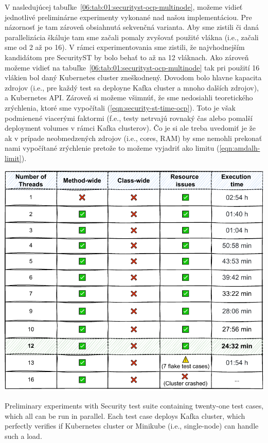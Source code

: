 V nasledujúcej tabuľke~\ref{06:tab:01:securityst-ocp-multinode}, možeme vidieť jednotlivé preliminárne experimenty vykonané
nad našou implementáciou. Pre názornosť je tam zároveň obsiahnutá sekvenčná varianta. Aby sme zistili či daná parallelizácia
škáluje tam sme začali pomaly zvyšovať použité vlákna (i.e., začali sme od 2 až po 16). V rámci experimentovania sme zistili,
že najvhodnejším kandidátom pre SecurityST by bolo behať to až na 12 vláknach. Ako zároveň možeme vidieť na
tabuľke~\ref{06:tab:01:securityst-ocp-multinode} tak pri použití 16 vlákien bol daný Kubernetes cluster zneškodnený.
Dovodom bolo hlavne kapacita zdrojov (i.e., pre každý test sa deployne Kafka cluster a mnoho dalších zdrojov), a Kubernetes API.
Zároveň si možeme všimnúť, že sme nedosiahli teoretického zrýchlenia, ktoré sme vypočítali (\eqref{eqn:security-st-time-ocp}).
Toto je však podmienené viacerými faktormi (f.e., testy netrvajú rovnaký čas alebo pomalší deployment volumes v rámci Kafka clusterov).
Čo je si ale treba uvedomiť je že ak v prípade neobmedzených zdrojov (i.e., cores, RAM) by sme nemohli prekonať nami vypočítané zrýchlenie
pretože to možeme vyjadriť ako limitu (\eqref{eqn:amdalh-limit}).
\begin{table}[ht!]
    \centering
    \includegraphics[scale=0.8]{obrazky-figures/08-experiments/06-exp-final-smoke-method-wide-ocp}
    \caption{Preliminary experiments with Security test suite containing twenty-one test cases, which all can be run in parallel.
    Each test case deploys Kafka cluster, which perfectly verifies if Kubernetes cluster or Minikube (i.e., single-node) can handle such a load.}
    \label{06:tab:01:securityst-ocp-multinode}
\end{table}

